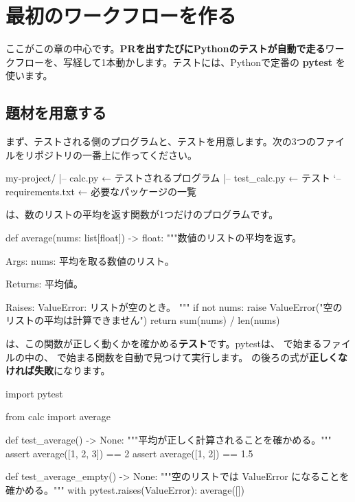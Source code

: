 \section{最初のワークフローを作る}

ここがこの章の中心です。\textbf{PRを出すたびにPythonのテストが自動で走る}ワークフローを、写経して1本動かします。テストには、Pythonで定番の \textbf{pytest} を使います。

\subsection{題材を用意する}

まず、テストされる側のプログラムと、テストを用意します。次の3つのファイルをリポジトリの一番上に作ってください。

\begin{codebox}[text]
\begin{code}
my-project/
|-- calc.py            ← テストされるプログラム
|-- test_calc.py       ← テスト
`-- requirements.txt   ← 必要なパッケージの一覧
\end{code}
\end{codebox}

 は、数のリストの平均を返す関数が1つだけのプログラムです。

\begin{codebox}[python]
\begin{code}
def average(nums: list[float]) -> float:
    """数値のリストの平均を返す。

    Args:
        nums: 平均を取る数値のリスト。

    Returns:
        平均値。

    Raises:
        ValueError: リストが空のとき。
    """
    if not nums:
        raise ValueError("空のリストの平均は計算できません")
    return sum(nums) / len(nums)
\end{code}
\end{codebox}

 は、この関数が正しく動くかを確かめる\textbf{テスト}です。pytestは、 で始まるファイルの中の、 で始まる関数を自動で見つけて実行します。 の後ろの式が\textbf{正しくなければ失敗}になります。

\begin{codebox}[python]
\begin{code}
import pytest

from calc import average


def test_average() -> None:
    """平均が正しく計算されることを確かめる。"""
    assert average([1, 2, 3]) == 2
    assert average([1, 2]) == 1.5


def test_average_empty() -> None:
    """空のリストでは ValueError になることを確かめる。"""
    with pytest.raises(ValueError):
        average([])
\end{code}
\end{codebox}

